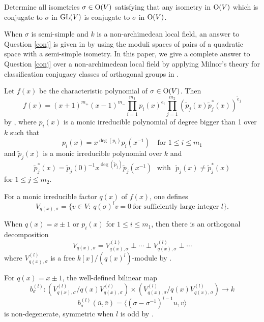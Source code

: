 \documentclass[12pt]{amsart}
\begin{document}
\begin{que}\label{conj}
Determine all isometries $\sigma \in {\rm O}(V)$ satisfying that any isometry in ${\rm O}(V)$ which is conjugate to $\sigma$ in ${\rm GL}(V)$ is conjugate to $\sigma$ in ${\rm O}(V)$. 
\end{que}

When $\sigma$ is semi-simple and $k$ is a non-archimedean local field, an answer to Question \ref{conj} is given in \cite{CHLX} by using the moduli spaces of  pairs of a quadratic space with a semi-simple isometry. In this paper, we give a complete answer to Question \ref{conj} over a non-archimedean local field by applying Milnor's theory for classification conjugacy classes of orthogonal groups in \cite{Mil}. 

\medskip
 

Let $f(x)$ be the characteristic polynomial of $\sigma\in  {\rm O}(V)$. Then 
 \begin{equation} \label{factor} f(x)=(x+1)^{m_+} (x-1)^{m_-} \prod_{i=1}^{m_1} p_i(x)^{e_i}  \prod_{j=1}^{m_2} (\tilde{p}_j(x) \tilde{p}_j^*(x))^{\tilde{e}_j} \end{equation}
  by \cite[7. Lemma (a)]{Le}, where $p_i(x)$ is a monic irreducible polynomial of degree bigger than 1 over $k$ such that $$p_i(x)=x^{\deg (p_i)} p_i(x^{-1}) \ \ \ \text{ for $1\leq i\leq m_1$} $$  and $\tilde{p}_j(x)$ is a monic irreducible polynomial over $k$ and 
$$ \tilde{p}_j^*(x) =\tilde{p}_j(0)^{-1} x^{\deg(\tilde{p}_j)} \tilde{p}_j(x^{-1})  \ \ \ \text{with} \ \ \ \tilde{p}_j(x) \neq \tilde{p}_j^*(x)$$ for $1\leq j\leq m_2$. 

For a monic irreducible factor $q(x)$ of $f(x)$, one defines 
$$ V_{q(x), \sigma} =\{ v\in V: \ q(\sigma)^l v =0   \ \text{for sufficiently large integer $l$} \} . $$

When $q(x)=x\pm 1$ or $p_i(x)$ for $1\leq i\leq m_1$, then there is an orthogonal decomposition
$$ V_{q(x), \sigma } = V_{q(x), \sigma }^{(1)} \perp \cdots \perp V_{q(x), \sigma }^{(l)} \perp \cdots $$
where  $V_{q(x), \sigma}^{(l)}$ is a free $k[x]/(q(x)^l)$-module by \cite[Theorem 3.2]{Mil}.

For $q(x)=x \pm 1$, the well-defined bilinear map 
\begin{equation} \label{bil}  b_{\sigma}^{(l)} :  (V_{q(x), \sigma}^{(l)}/q(x)V_{q(x), \sigma}^{(l)} )  \times (V_{q(x), \sigma}^{(l)}/q(x)V_{q(x), \sigma}^{(l)}) \rightarrow k \end{equation}
 $$ b_{\sigma}^{(l)}(\bar u, \bar v) = \langle (\sigma-\sigma^{-1})^{l-1} u, v \rangle $$
is non-degenerate, symmetric when $l$ is odd by \cite[Theorem 3.4]{Mil}.  
\end{document}
